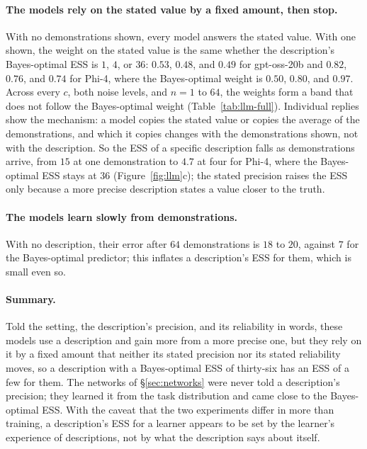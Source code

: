 \documentclass{article}
\begin{document}
\paragraph{The models rely on the stated value by a fixed amount, then stop.} With no demonstrations shown, every model answers the stated value. With one shown, the weight on the stated value is the same whether the description's Bayes-optimal ESS is $1$, $4$, or $36$: $0.53$, $0.48$, and $0.49$ for gpt-oss-20b and $0.82$, $0.76$, and $0.74$ for Phi-4, where the Bayes-optimal weight is $0.50$, $0.80$, and $0.97$. Across every $c$, both noise levels, and $n = 1$ to $64$, the weights form a band that does not follow the Bayes-optimal weight (Table~\ref{tab:llm-full}). Individual replies show the mechanism: a model copies the stated value or copies the average of the demonstrations, and which it copies changes with the demonstrations shown, not with the description. So the ESS of a specific description falls as demonstrations arrive, from $15$ at one demonstration to $4.7$ at four for Phi-4, where the Bayes-optimal ESS stays at $36$ (Figure~\ref{fig:llm}c); the stated precision raises the ESS only because a more precise description states a value closer to the truth.

\paragraph{The models learn slowly from demonstrations.} With no description, their error after $64$ demonstrations is $18$ to $20$, against $7$ for the Bayes-optimal predictor; this inflates a description's ESS for them, which is small even so.

\paragraph{Summary.} Told the setting, the description's precision, and its reliability in words, these models use a description and gain more from a more precise one, but they rely on it by a fixed amount that neither its stated precision nor its stated reliability moves, so a description with a Bayes-optimal ESS of thirty-six has an ESS of a few for them. The networks of \S\ref{sec:networks} were never told a description's precision; they learned it from the task distribution and came close to the Bayes-optimal ESS. With the caveat that the two experiments differ in more than training, a description's ESS for a learner appears to be set by the learner's experience of descriptions, not by what the description says about itself.
\end{document}
